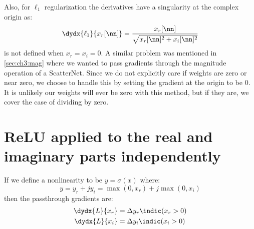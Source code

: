 Also, for $\ell_1$ regularization the derivatives have a singularity at the complex
origin as:
\begin{equation}
  \dydx{\ell_1}{x_r[\nn]} = \frac{x_r[\nn]}{\sqrt{x_r[\nn]^2 + x_i[\nn]^2}}
\end{equation}
is not defined when $x_r=x_i=0$. A similar problem was mentioned in \autoref{sec:ch3:mag}
where we wanted to pass gradients through the magnitude operation of a
ScatterNet. Since we do not explicitly care if weights are zero or near zero, we choose
to handle this by setting the gradient at the origin to be 0. It is unlikely our
weights will ever be zero with this method, but if they are, we cover the case of dividing 
by zero. 

\section{ReLU applied to the real and imaginary parts independently}\label{sec:appE:complex_relu}
If we define a nonlinearity to be $y = \sigma(x)$ where:
\begin{equation}
  y = y_r + jy_i = \max(0, x_r) + j\max(0, x_i)
\end{equation}
then the passthrough gradients are:
\begin{align}
  \dydx{L}{x_r} &= \Delta y_r \indic(x_r > 0)\\
  \dydx{L}{x_i} &= \Delta y_i \indic(x_i > 0)
\end{align}

